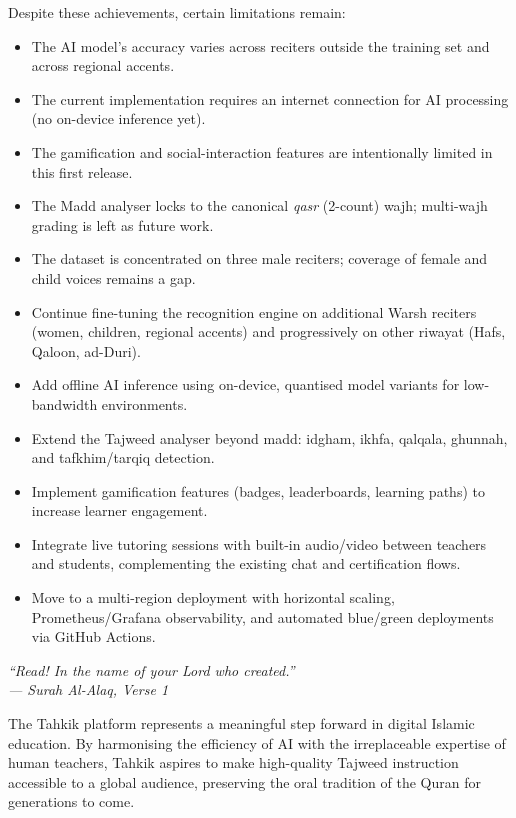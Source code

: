 Despite these achievements, certain limitations remain:
\begin{itemize}
  \item The AI model's accuracy varies across reciters outside the
        training set and across regional accents.
  \item The current implementation requires an internet connection for
        AI processing (no on-device inference yet).
  \item The gamification and social-interaction features are
        intentionally limited in this first release.
  \item The Madd analyser locks to the canonical \emph{qasr} (2-count)
        wajh; multi-wajh grading is left as future work.
  \item The dataset is concentrated on three male reciters; coverage of
        female and child voices remains a gap.
\end{itemize}

\begin{goldbox}[title=Future Perspectives]
\begin{itemize}
  \item Continue fine-tuning the recognition engine on additional Warsh
        reciters (women, children, regional accents) and progressively
        on other riwayat (Hafs, Qaloon, ad-Duri).
  \item Add offline AI inference using on-device, quantised model
        variants for low-bandwidth environments.
  \item Extend the Tajweed analyser beyond madd: idgham, ikhfa,
        qalqala, ghunnah, and tafkhim/tarqiq detection.
  \item Implement gamification features (badges, leaderboards, learning
        paths) to increase learner engagement.
  \item Integrate live tutoring sessions with built-in audio/video
        between teachers and students, complementing the existing chat
        and certification flows.
  \item Move to a multi-region deployment with horizontal scaling,
        Prometheus/Grafana observability, and automated blue/green
        deployments via GitHub Actions.
\end{itemize}
\end{goldbox}

\begin{emeraldbox}[title=Closing Statement]
\begin{center}
\large\itshape
``Read! In the name of your Lord who created.''\\[6pt]
\normalsize\normalfont\color{black} --- Surah Al-Alaq, Verse 1
\end{center}
\vspace{6pt}
\normalsize
The Tahkik platform represents a meaningful step forward in digital
Islamic education. By harmonising the efficiency of AI with the
irreplaceable expertise of human teachers, Tahkik aspires to make
high-quality Tajweed instruction accessible to a global audience,
preserving the oral tradition of the Quran for generations to come.
\end{emeraldbox}
